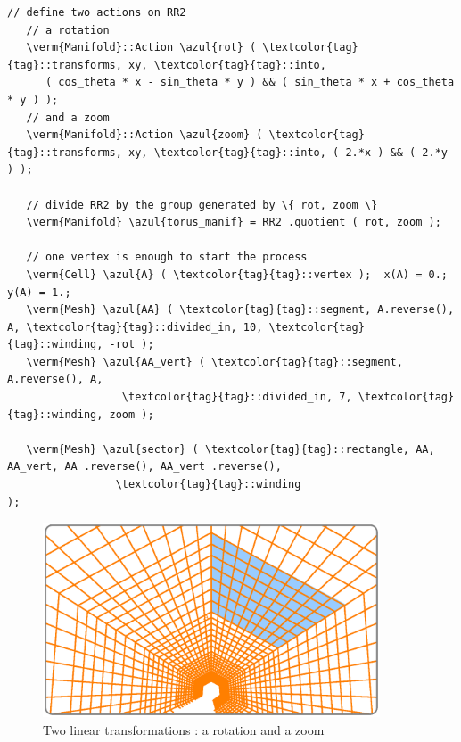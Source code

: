 \begin{Verbatim}[commandchars=\\\{\},formatcom=\small\tt,frame=single,
   label=parag-\ref{\numb section 7.\numb parag 15}.cpp,rulecolor=\color{coment},
   baselinestretch=0.94,framesep=2mm                                             ]
   // define two actions on RR2
   // a rotation
   \verm{Manifold}::Action \azul{rot} ( \textcolor{tag}{tag}::transforms, xy, \textcolor{tag}{tag}::into,
      ( cos_theta * x - sin_theta * y ) && ( sin_theta * x + cos_theta * y ) );
   // and a zoom
   \verm{Manifold}::Action \azul{zoom} ( \textcolor{tag}{tag}::transforms, xy, \textcolor{tag}{tag}::into, ( 2.*x ) && ( 2.*y ) );

   // divide RR2 by the group generated by \{ rot, zoom \}
   \verm{Manifold} \azul{torus_manif} = RR2 .quotient ( rot, zoom );

   // one vertex is enough to start the process
   \verm{Cell} \azul{A} ( \textcolor{tag}{tag}::vertex );  x(A) = 0.;  y(A) = 1.;
   \verm{Mesh} \azul{AA} ( \textcolor{tag}{tag}::segment, A.reverse(), A, \textcolor{tag}{tag}::divided_in, 10, \textcolor{tag}{tag}::winding, -rot );
   \verm{Mesh} \azul{AA_vert} ( \textcolor{tag}{tag}::segment, A.reverse(), A,
                  \textcolor{tag}{tag}::divided_in, 7, \textcolor{tag}{tag}::winding, zoom );

   \verm{Mesh} \azul{sector} ( \textcolor{tag}{tag}::rectangle, AA, AA_vert, AA .reverse(), AA_vert .reverse(),
                 \textcolor{tag}{tag}::winding                                                    );
\end{Verbatim}
  
\begin{figure}[ht] \centering
  \includegraphics[width=100mm]{sector-3.eps}
  \caption{Two linear transformations : a rotation and a zoom}
  \label{\numb section 7.\numb fig 11}
\end{figure}


